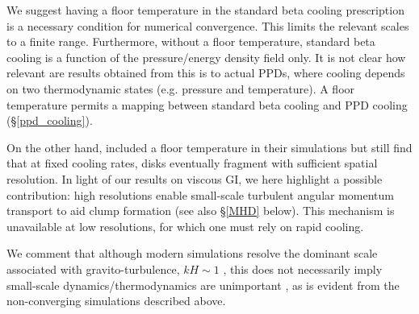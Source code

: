 We suggest having a floor temperature in the standard beta
cooling prescription is a necessary condition for  
numerical convergence. This limits the
relevant scales to a finite range.  %
Furthermore, without a floor temperature, standard beta cooling is
a function of the pressure/energy density field only. It is not clear
how relevant are results obtained from this is to actual PPDs,
where cooling depends on two thermodynamic states (e.g. pressure and
temperature). A floor temperature permits a mapping between standard beta
cooling and PPD cooling (\S\ref{ppd_cooling}). 

%


On the other hand, \cite{baehr15} included a floor temperature 
in their simulations but still find that at fixed cooling rates, disks
eventually fragment with sufficient spatial resolution.
In light of our results on viscous GI, 
we here highlight a possible contribution: %
high resolutions enable small-scale turbulent angular momentum transport 
to aid clump formation (see also \S\ref{MHD} below). 
This mechanism is unavailable at low resolutions, for which one must
rely on rapid cooling.  

We comment that although modern simulations resolve the dominant
scale associated with gravito-turbulence, $kH\sim 1$
\citep{cossins09}, this does not
necessarily imply small-scale dynamics/thermodynamics are unimportant 
\citep[especially for non-linear evolution, ][]{young15},  
as is evident from the non-converging simulations described above.   



